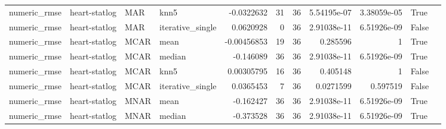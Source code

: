 \begin{table}[ht]
\begin{tabular}{llllrrrrrll}
 numeric\_rmse           & heart-statlog        & MAR         & knn5             &     -0.0322632   &                  31 &      36 & 5.54195e-07 & 3.38059e-05 & True               &                                                                                                                    \\
 numeric\_rmse           & heart-statlog        & MAR         & iterative\_single &      0.0620928   &                   0 &      36 & 2.91038e-11 & 6.51926e-09 & False              &                                                                                                                    \\
 numeric\_rmse           & heart-statlog        & MCAR        & mean             &     -0.00456853  &                  19 &      36 & 0.285596    & 1           & True               &                                                                                                                    \\
 numeric\_rmse           & heart-statlog        & MCAR        & median           &     -0.146089    &                  36 &      36 & 2.91038e-11 & 6.51926e-09 & True               &                                                                                                                    \\
 numeric\_rmse           & heart-statlog        & MCAR        & knn5             &      0.00305795  &                  16 &      36 & 0.405148    & 1           & False              &                                                                                                                    \\
 numeric\_rmse           & heart-statlog        & MCAR        & iterative\_single &      0.0365453   &                   7 &      36 & 0.0271599   & 0.597519    & False              &                                                                                                                    \\
 numeric\_rmse           & heart-statlog        & MNAR        & mean             &     -0.162427    &                  36 &      36 & 2.91038e-11 & 6.51926e-09 & True               &                                                                                                                    \\
 numeric\_rmse           & heart-statlog        & MNAR        & median           &     -0.373528    &                  36 &      36 & 2.91038e-11 & 6.51926e-09 & True               &                                                                                                                    \\

\end{tabular}
\end{table}
